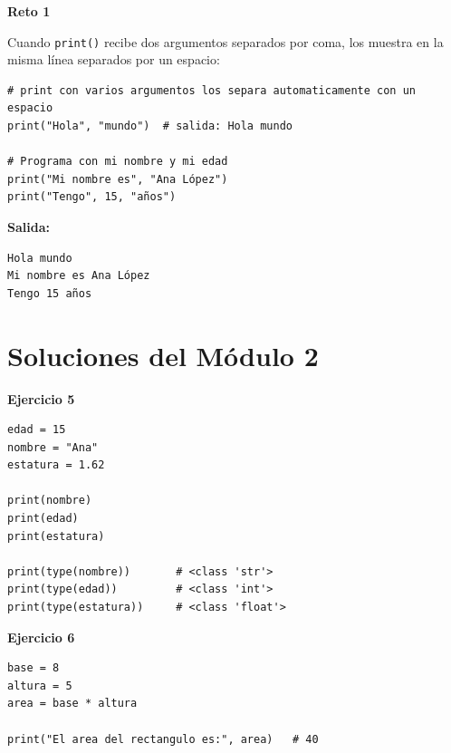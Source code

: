\documentclass[12pt,a4paper]{article}
\begin{document}
\begin{cajaSolucion}
\textbf{Reto 1}

Cuando \texttt{print()} recibe dos argumentos separados por coma, los muestra en la misma línea separados por un espacio:
\begin{lstlisting}[style=pythonStyle]
# print con varios argumentos los separa automaticamente con un espacio
print("Hola", "mundo")  # salida: Hola mundo

# Programa con mi nombre y mi edad
print("Mi nombre es", "Ana López")
print("Tengo", 15, "años")
\end{lstlisting}
\textbf{Salida:}
\begin{lstlisting}[style=pythonStyle]
Hola mundo
Mi nombre es Ana López
Tengo 15 años
\end{lstlisting}
\end{cajaSolucion}

\section{Soluciones del Módulo 2}

\begin{cajaSolucion}
\textbf{Ejercicio 5}
\begin{lstlisting}[style=pythonStyle]
edad = 15
nombre = "Ana"
estatura = 1.62

print(nombre)
print(edad)
print(estatura)

print(type(nombre))       # <class 'str'>
print(type(edad))         # <class 'int'>
print(type(estatura))     # <class 'float'>
\end{lstlisting}
\end{cajaSolucion}

\begin{cajaSolucion}
\textbf{Ejercicio 6}
\begin{lstlisting}[style=pythonStyle]
base = 8
altura = 5
area = base * altura

print("El area del rectangulo es:", area)   # 40
\end{lstlisting}
\end{cajaSolucion}
\end{document}
